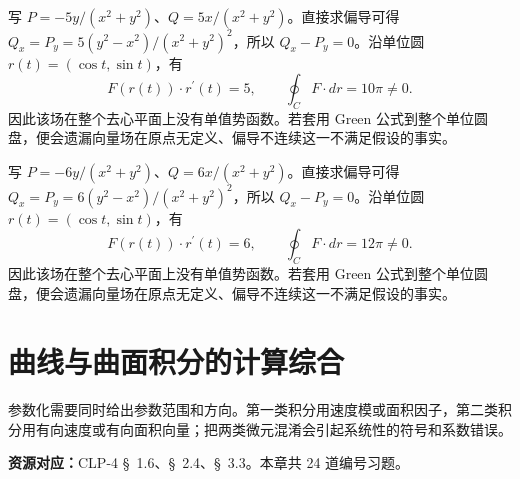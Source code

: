\documentclass[UTF8,12pt,a4paper,fontset=fandol]{ctexart}
\begin{document}
\begin{solve}\label{ans:c41q24}
写 $P=-5y/(x^2+y^2)$、$Q=5x/(x^2+y^2)$。直接求偏导可得 $Q_x=P_y=5(y^2-x^2)/(x^2+y^2)^2$，所以 $Q_x-P_y=0$。沿单位圆 $r(t)=(\cos t,\sin t)$，有
\[
F(r(t))\cdot r^{\prime}(t)=5,\qquad\oint_C F\cdot dr=10\pi\ne0.
\]
因此该场在整个去心平面上没有单值势函数。若套用 Green 公式到整个单位圆盘，便会遗漏向量场在原点无定义、偏导不连续这一不满足假设的事实。
\end{solve}

\begin{solve}\label{ans:c41q25}
写 $P=-6y/(x^2+y^2)$、$Q=6x/(x^2+y^2)$。直接求偏导可得 $Q_x=P_y=6(y^2-x^2)/(x^2+y^2)^2$，所以 $Q_x-P_y=0$。沿单位圆 $r(t)=(\cos t,\sin t)$，有
\[
F(r(t))\cdot r^{\prime}(t)=6,\qquad\oint_C F\cdot dr=12\pi\ne0.
\]
因此该场在整个去心平面上没有单值势函数。若套用 Green 公式到整个单位圆盘，便会遗漏向量场在原点无定义、偏导不连续这一不满足假设的事实。
\end{solve}

\clearpage
\section{曲线与曲面积分的计算综合}\label{sec:ch42}
参数化需要同时给出参数范围和方向。第一类积分用速度模或面积因子，第二类积分用有向速度或有向面积向量；把两类微元混淆会引起系统性的符号和系数错误。

\textbf{资源对应：}CLP-4 \S~1.6、\S~2.4、\S~3.3。本章共 24 道编号习题。
\end{document}
